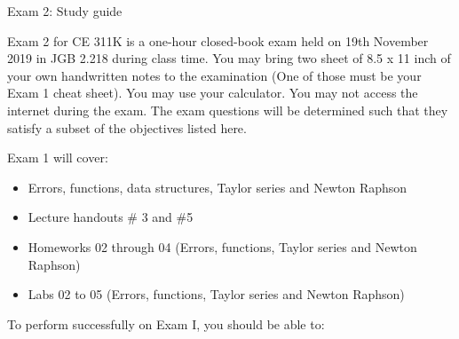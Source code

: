 \documentclass[]{article}
\begin{document}
\begin{center}
\Large Exam 2: Study guide
\end{center}

Exam 2 for CE 311K is a one-hour closed-book exam held on 19th November 2019 in JGB 2.218 during class time. You may bring two sheet of 8.5 x 11 inch of your own handwritten notes to the examination (One of those must be your Exam 1 cheat sheet). You may use your calculator. You may not access the internet during the exam. The exam questions will be determined such that they satisfy a subset of the objectives listed here.

Exam 1 will cover:
\begin{itemize}
	\item Errors, functions, data structures, Taylor series and Newton Raphson
	\item Lecture handouts \# 3 and \#5 
	\item Homeworks 02 through 04 (Errors, functions, Taylor series and Newton Raphson)
	\item Labs 02 to 05 (Errors, functions, Taylor series and Newton Raphson)
\end{itemize}

To perform successfully on Exam I, you should be able to:
\end{document}
